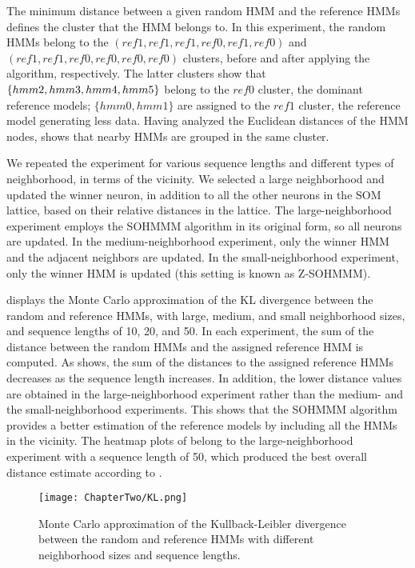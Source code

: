 The minimum distance between a given random HMM and the reference HMMs defines the cluster that the HMM belongs to. In this experiment, the random HMMs belong to the $(ref1,ref1,ref1,ref0,ref1,ref0)$ and $(ref1,ref1,ref0,ref0,ref0,ref0)$ clusters, before and after applying the algorithm, respectively. The latter clusters show that $\{hmm2,hmm3,hmm4\-,hmm5\}$ belong to the $ref0$ cluster, the dominant reference models; $\{hmm0,hmm1\}$ are assigned to the $ref1$ cluster, the reference model generating less data. Having analyzed the Euclidean distances of the HMM nodes,  shows that nearby HMMs are grouped in the same cluster.

We repeated the experiment for various sequence lengths and different types of neighborhood, in terms of the vicinity. We selected a large neighborhood and updated the winner neuron, in addition to all the other neurons in the SOM lattice, based on their relative distances in the lattice. The large-neighborhood experiment employs the SOHMMM algorithm in its original form, so all neurons are updated. In the medium-neighborhood experiment, only the winner HMM and the adjacent neighbors are updated. In the small-neighborhood experiment, only the winner HMM is updated (this setting is known as Z-SOHMMM).

 displays the Monte Carlo approximation of the KL divergence between the random and reference HMMs, with large, medium, and small neighborhood sizes, and sequence lengths of 10, 20, and 50. In each experiment, the sum of the distance between the random HMMs and the assigned reference HMM is computed. As  shows, the sum of the distances to the assigned reference HMMs decreases as the sequence length increases. In addition, the lower distance values are obtained in the large-neighborhood experiment rather than the medium- and the small-neighborhood experiments. This shows that the SOHMMM algorithm provides a better estimation of the reference models by including all the HMMs in the vicinity. The heatmap plots of  belong to the large-neighborhood experiment with a sequence length of 50, which produced the best overall distance estimate according to .

\begin{figure}[h]
    \centering
    \texttt{[image: ChapterTwo/KL.png]}
    \caption{Monte Carlo approximation of the Kullback-Leibler divergence between the random and reference HMMs with different neighborhood sizes and sequence lengths.}
    \label{fig:sohmmm_dist_neig}
\end{figure}

